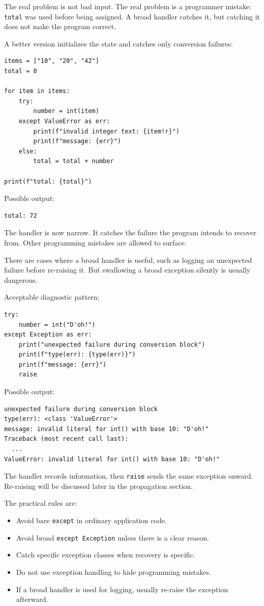 \documentclass[a4paper,twoside]{report}
\begin{document}
The real problem is not bad input. The real problem is a programmer mistake: \texttt{total} was used before being assigned. A broad handler catches it, but catching it does not make the program correct.

A better version initializes the state and catches only conversion failures:

\begin{verbatim}
items = ["10", "20", "42"]
total = 0

for item in items:
    try:
        number = int(item)
    except ValueError as err:
        print(f"invalid integer text: {item!r}")
        print(f"message: {err}")
    else:
        total = total + number

print(f"total: {total}")
\end{verbatim}

Possible output:

\begin{verbatim}
total: 72
\end{verbatim}

The handler is now narrow. It catches the failure the program intends to recover from. Other programming mistakes are allowed to surface.

There are cases where a broad handler is useful, such as logging an unexpected failure before re-raising it. But swallowing a broad exception silently is usually dangerous.

Acceptable diagnostic pattern:

\begin{verbatim}
try:
    number = int("D'oh!")
except Exception as err:
    print("unexpected failure during conversion block")
    print(f"type(err): {type(err)}")
    print(f"message: {err}")
    raise
\end{verbatim}

Possible output:

\begin{verbatim}
unexpected failure during conversion block
type(err): <class 'ValueError'>
message: invalid literal for int() with base 10: "D'oh!"
Traceback (most recent call last):
  ...
ValueError: invalid literal for int() with base 10: "D'oh!"
\end{verbatim}

The handler records information, then \texttt{raise} sends the same exception onward. Re-raising will be discussed later in the propagation section.

The practical rules are:

\begin{itemize}
    \item Avoid bare \texttt{except} in ordinary application code.
    \item Avoid broad \texttt{except Exception} unless there is a clear reason.
    \item Catch specific exception classes when recovery is specific.
    \item Do not use exception handling to hide programming mistakes.
    \item If a broad handler is used for logging, usually re-raise the exception afterward.
\end{itemize}
\end{document}
